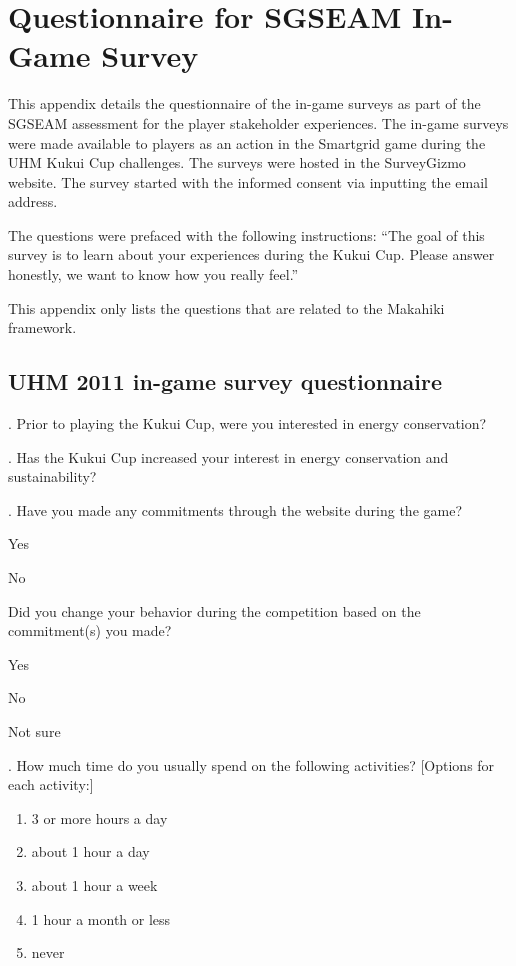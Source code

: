 \section{Questionnaire for SGSEAM In-Game Survey}
\label{app:in-game-questionnaire}

This appendix details the questionnaire of the in-game surveys as part of the SGSEAM assessment for the player stakeholder experiences. The in-game surveys were made available to players as an action in the Smartgrid game during the UHM Kukui Cup challenges. The surveys were hosted in the SurveyGizmo website. The survey started with the informed consent via inputting the email address. 

The questions were prefaced with the following instructions: ``The goal of this survey is to learn about your experiences during the Kukui Cup. Please answer honestly, we want to know how you really feel.''

This appendix only lists the questions that are related to the Makahiki framework.

\subsection {UHM 2011 in-game survey questionnaire}
. Prior to playing the Kukui Cup, were you interested in energy conservation?

. Has the Kukui Cup increased your interest in energy conservation and sustainability?

. Have you made any commitments through the website during the game?
\begin{radiobutton}
	\item Yes
	\item No
\end{radiobutton}

\noindent
[If Yes] Did you change your behavior during the competition based on the commitment(s) you made?
\begin{radiobutton}
	\item Yes
	\item No
	\item Not sure
\end{radiobutton}

. How much time do you usually spend on the following activities?
[Options for each activity:]
\begin{enumerate}
	\item 3 or more hours a day
	\item about 1 hour a day
	\item about 1 hour a week
	\item 1 hour a month or less
	\item never
\end{enumerate}

